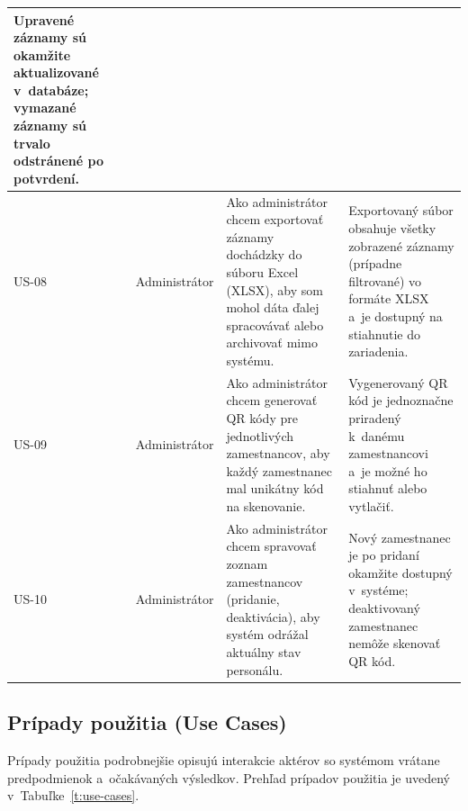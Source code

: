 \begin{longtable}{|p{1.2cm}|p{2.6cm}|p{5.4cm}|p{5.4cm}|}
Upravené záznamy sú okamžite aktualizované v~databáze; vymazané záznamy sú trvalo
odstránené po potvrdení. \\
\hline
US-08 & Administrátor &
Ako administrátor chcem exportovať záznamy dochádzky do súboru Excel (XLSX), aby som
mohol dáta ďalej spracovávať alebo archivovať mimo systému. &
Exportovaný súbor obsahuje všetky zobrazené záznamy (prípadne filtrované) vo
formáte XLSX a~je dostupný na stiahnutie do zariadenia. \\
\hline
US-09 & Administrátor &
Ako administrátor chcem generovať QR kódy pre jednotlivých zamestnancov, aby každý
zamestnanec mal unikátny kód na skenovanie. &
Vygenerovaný QR kód je jednoznačne priradený k~danému zamestnancovi a~je možné
ho stiahnuť alebo vytlačiť. \\
\hline
US-10 & Administrátor &
Ako administrátor chcem spravovať zoznam zamestnancov (pridanie, deaktivácia),
aby systém odrážal aktuálny stav personálu. &
Nový zamestnanec je po pridaní okamžite dostupný v~systéme; deaktivovaný
zamestnanec nemôže skenovať QR kód. \\
\hline
\end{longtable}

\subsection{Prípady použitia (Use Cases)}

Prípady použitia podrobnejšie opisujú interakcie aktérov so systémom vrátane
predpodmienok a~očakávaných výsledkov. Prehľad prípadov použitia je uvedený
v~Tabuľke~\ref{t:use-cases}.

